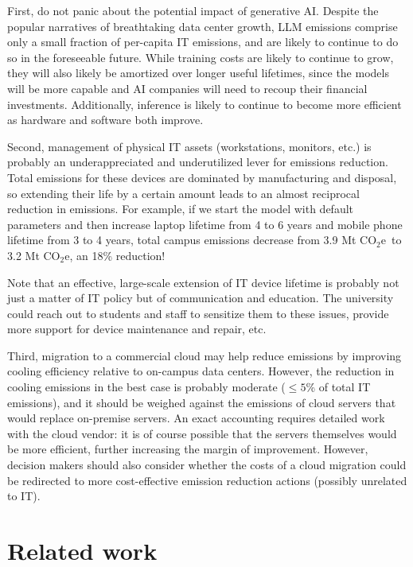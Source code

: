 \documentclass[11pt]{article}
\newcommand{\coe}{CO$_2$e}
\newcommand{\tcoe}{t \coe}
\begin{document}
First, do not panic about the potential impact of generative AI. Despite the popular narratives of breathtaking data center growth, LLM emissions comprise only a small fraction of per-capita IT emissions, and are likely to continue to do so in the foreseeable future. While training costs are likely to continue to grow, they will also likely be amortized over longer useful lifetimes, since the models will be more capable and AI companies will need to recoup their financial investments. Additionally, inference is likely to continue to become more efficient as hardware and software both improve.

Second, management of physical IT assets (workstations, monitors, etc.) is probably an underappreciated and underutilized lever for emissions reduction. Total emissions for these devices are dominated by manufacturing and disposal, so extending their life by a certain amount leads to an almost reciprocal reduction in emissions. For example, if we start the model with default parameters and then increase laptop lifetime from 4 to 6 years and mobile phone lifetime from 3 to 4 years, total campus emissions decrease from 3.9 M\tcoe\ to 3.2 M\tcoe, an 18\% reduction!

Note that an effective, large-scale extension of IT device lifetime is probably not just a matter of IT policy but of communication and education. The university could reach out to students and staff to sensitize them to these issues, provide more support for device maintenance and repair, etc.

Third, migration to a commercial cloud may help reduce emissions by improving cooling efficiency relative to on-campus data centers. However, the reduction in cooling emissions in the best case is probably moderate ($\le 5$\% of total IT emissions), and it should be weighed against the emissions of cloud servers that would replace on-premise servers. An exact accounting requires detailed work with the cloud vendor: it is of course possible that the servers themselves would be more efficient, further increasing the margin of improvement. However, decision makers should also consider whether the costs of a cloud migration could be redirected to more cost-effective emission reduction actions (possibly unrelated to IT).

\section{Related work}
\label{sec:related:work}
\end{document}
